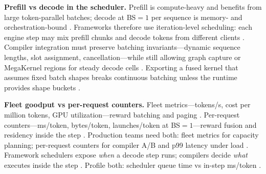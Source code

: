 \textbf{Prefill vs decode in the scheduler.} Prefill is compute-heavy and benefits from large token-parallel batches; decode at BS${=}1$ per sequence is memory- and orchestration-bound \citep{dao2022flashattention,patel2025llminference,memoryfloor2026}. Frameworks therefore use iteration-level scheduling: each engine step may mix prefill chunks and decode tokens from different clients \citep{kwon2023vllm,patel2025llminference,liu2024deepseekv3}. Compiler integration must preserve batching invariants---dynamic sequence lengths, slot assignment, cancellation---while still allowing graph capture or MegaKernel regions for steady decode cells \citep{nvidia2024cudagraphs,yirage2026,kwon2023vllm,liu2024deepseekv3,taxbreak2026,memoryfloor2026,semianalysis2024tma,dao2022flashattention,dao2023flashdecoding,dlbook,amd2024xdna,amd2024aie,nvidia2022hopper}. Exporting a fused kernel that assumes fixed batch shapes breaks continuous batching unless the runtime provides shape buckets \citep{nvidia2024cudagraphs,yirage2026,chen2020compilerbasedhardw,memoryfloor2026}.

\textbf{Fleet goodput vs per-request counters.} Fleet metrics---tokens/s, cost per million tokens, GPU utilization---reward batching and paging \citep{kwon2023vllm,patel2025llminference,dlbook}. Per-request counters---ms/token, bytes/token, launches/token at BS${=}1$---reward fusion and residency inside the step \citep{taxbreak2026,memoryfloor2026,yirage2026,chen2020compilerbasedhardw}. Production teams need both: fleet metrics for capacity planning; per-request counters for compiler A/B and p99 latency under load \citep{patel2025llminference,memoryfloor2026,taxbreak2026,kwon2023vllm,yirage2026}. Framework schedulers expose \emph{when} a decode step runs; compilers decide \emph{what} executes inside the step \citep{patel2025llminference,yirage2026,chen2020compilerbasedhardw,taxbreak2026,memoryfloor2026,kwon2023vllm,liu2024deepseekv3,nvidia2024cudagraphs,dao2022flashattention,semianalysis2024tma,dlbook}. Profile both: scheduler queue time vs in-step ms/token \citep{patel2025llminference,memoryfloor2026,taxbreak2026,yirage2026,chen2020compilerbasedhardw,dlbook}.

